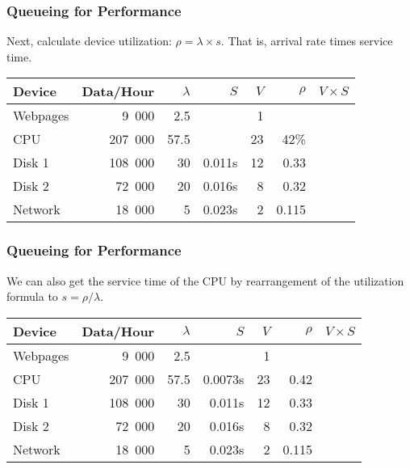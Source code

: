 \begin{frame}
\frametitle{Queueing for Performance}

\begin{changemargin}{1cm}
\large 
Next, calculate device utilization: $\rho = \lambda \times s$. That is, arrival rate times service time.
\end{changemargin}

\begin{center}
\begin{tabular}{l|r|r|r|r|r|r} 
	\textbf{Device} & \textbf{Data/Hour} & \textbf{$\lambda$} & \textbf{$S$} & \textbf{$V$} & \textbf{$\rho$} & \textbf{$V \times S$} \\ \hline
	Webpages & 9~000 & 2.5 & & 1 & & \\ \hline
	CPU & 207~000 & 57.5 &  & 23 & 42\% & \\ \hline
	Disk 1 & 108~000 & 30 & 0.011s  & 12& 0.33 &\\ \hline
	Disk 2 & 72~000 & 20 & 0.016s & 8 & 0.32 &\\ \hline
	Network & 18~000 & 5 & 0.023s & 2 & 0.115 &\\ 
\end{tabular}
\end{center}

\end{frame}



\begin{frame}
\frametitle{Queueing for Performance}

\begin{changemargin}{1cm}
\large 
We can also get the service time of the CPU by rearrangement of the utilization formula to $s = \rho / \lambda$.
\end{changemargin}

\begin{center}
\begin{tabular}{l|r|r|r|r|r|r} 
	\textbf{Device} & \textbf{Data/Hour} & \textbf{$\lambda$} & \textbf{$S$} & \textbf{$V$} & \textbf{$\rho$} & \textbf{$V \times S$} \\ \hline
	Webpages & 9~000 & 2.5 & & 1 & & \\ \hline
	CPU & 207~000 & 57.5 & 0.0073s & 23 & 0.42 & \\ \hline
	Disk 1 & 108~000 & 30 & 0.011s  & 12& 0.33 &\\ \hline
	Disk 2 & 72~000 & 20 & 0.016s & 8 & 0.32 &\\ \hline
	Network & 18~000 & 5 & 0.023s & 2 & 0.115 &
\end{tabular}
\end{center}

\end{frame}



